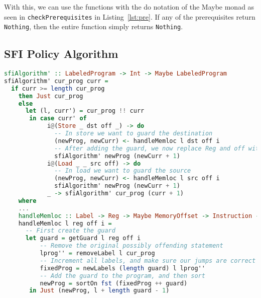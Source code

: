 With this, we can use the functions with the do notation of the Maybe monad as
seen in \texttt{checkPrerequisites} in Listing~\ref{lst:pre}. If any of the
prerequisites return \texttt{Nothing}, then the entire function simply returns
\texttt{Nothing}.

\subsection{SFI Policy Algorithm}
\begin{lstlisting}[language={haskell}, caption={SFI algorithm}, label={lst:sfi}]
sfiAlgorithm' :: LabeledProgram -> Int -> Maybe LabeledProgram
sfiAlgorithm' cur_prog curr =
  if curr >= length cur_prog
    then Just cur_prog
    else
      let (l, curr') = cur_prog !! curr
       in case curr' of
            i@(Store _ dst off _) -> do
              -- In store we want to guard the destination
              (newProg, newCurr) <- handleMemloc l dst off i
              -- After adding the guard, we now replace Reg and off with reg 11
              sfiAlgorithm' newProg (newCurr + 1)
            i@(Load _ _ src off) -> do
              -- In load we want to guard the source
              (newProg, newCurr) <- handleMemloc l src off i
              sfiAlgorithm' newProg (newCurr + 1)
            _ -> sfiAlgorithm' cur_prog (curr + 1)
    where
    ...
    handleMemloc :: Label -> Reg -> Maybe MemoryOffset -> Instruction -> Maybe (LabeledProgram, Int)
    handleMemloc l reg off i =
      -- First create the guard
      let guard = getGuard l reg off i
          -- Remove the original possibly offending statement
          lprog'' = removeLabel l cur_prog
          -- Increment all labels, and make sure our jumps are correct
          fixedProg = newLabels (length guard) l lprog''
          -- Add the guard to the program, and then sort
          newProg = sortOn fst (fixedProg ++ guard)
       in Just (newProg, l + length guard - 1)


\end{lstlisting}

